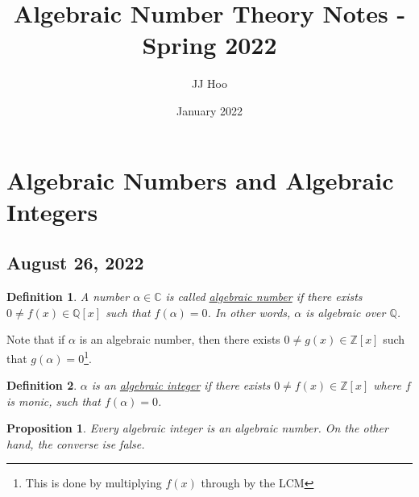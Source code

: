 \documentclass{article}
\title{Algebraic Number Theory Notes - Spring 2022}
\author{JJ Hoo}
\date{January 2022}
\newcommand{\C}{\mathbb{C}}
\newcommand{\Q}{\mathbb{Q}}
\newcommand{\Z}{\mathbb{Z}}
\newtheorem{proposition}{Proposition}
\newtheorem{definition}{Definition}
\begin{document}
\maketitle
\tableofcontents
\newpage
\section{Algebraic Numbers and Algebraic Integers}
\subsection{August 26, 2022}
\begin{definition}
A number $\alpha\in\C$ is called \underline{algebraic number} if there exists $0\neq f(x)\in\Q[x]$ such that $f(\alpha)=0$. In other words, $\alpha$ is algebraic over $\Q$.
\end{definition}
\noindent Note that if $\alpha$ is an algebraic number, then there exists $0\neq g(x)\in\Z[x]$ such that $g(\alpha)=0$\footnote{This is done by multiplying $f(x)$ through by the LCM}.
\begin{definition}
$\alpha$ is an \underline{algebraic integer} if there exists $0\neq f(x)\in \Z[x]$ where $f$ is monic, such that $f(\alpha)=0$.
\end{definition}
\begin{proposition}
Every algebraic integer is an algebraic number. On the other hand, the converse ise false.
\end{proposition}
\end{document}
